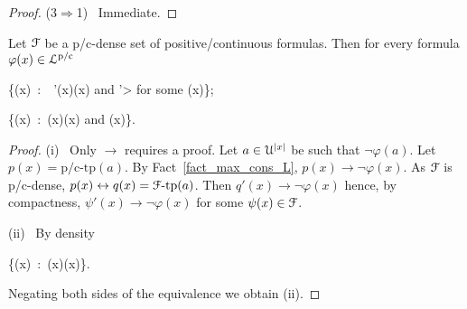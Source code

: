 \documentclass{amsproc}
\renewcommand*{\emph}[1]{%
   \smash{\tikz[baseline]\node[rectangle, fill=teal!25, rounded corners, inner xsep=0.5ex, inner ysep=0.2ex, anchor=base, minimum height = 2.7ex]{\strut #1};}}
\begin{document}
{\begin{proof}
  (3$\Rightarrow$1) \ 
  Immediate.
\end{proof}

\begin{proposition}\label{prop_Fapprox}
  Let ${\EuScript F}$ be a p/c-dense set of positive/continuous formulas.
  Then for every formula $\varphi(x)\in{\EuScript L}^{\rm p/c}$
  
  {\leftrightarrow}
  {\bigvee\big\{\phantom\neg\psi(x)\ :\ \ \psi'(x)\rightarrow\neg\varphi(x)\textrm{ and }\psi'>\psi\textrm{ for some }\psi(x)\big\};}

  {\leftrightarrow}
  {\bigvee\big\{\neg\psi(x)\ :\ \neg\psi(x)\rightarrow\neg\varphi(x)\textrm{ and }\psi(x)\big\}.}

\end{proposition}
 
\begin{proof} 
  (i) \ Only $\rightarrow$ requires a proof.
  Let $a\in {\EuScript U}^{|x|}$ be such that $\neg\varphi(a)$.
  Let $p(x)=\mbox{p/c-tp}(a)$.
  By Fact~\ref{fact_max_cons_L}, $p(x)\rightarrow\neg\varphi(x)$.
  As ${\EuScript F}$ is p/c-dense, $p(x)\leftrightarrow q(x)={\EuScript F}\mbox{-tp}(a)$.
  Then $q'(x)\rightarrow\neg\varphi(x)$ hence, by compactness, $\psi'(x)\rightarrow\neg\varphi(x)$ for some $\psi(x)\in{\EuScript F}$.

  (ii) \ By density

  {\leftrightarrow}
  {\bigwedge\big\{\psi(x)\ :\ \varphi(x)\rightarrow\psi(x)\big\}.}
  
  Negating both sides of the equivalence we obtain (ii).
\end{proof}


\begin{comment}
\section{Elimination of quantifiers of sort \textsf{I} for positive formulas}\label{Ielimination}

We write \emph{${\EuScript L}^{\rm p/c}_{{\sf I}{\rm qf}}$} for the set of positive/continuous formulas without quantifiers of sort ${\sf I}$.

In this section we show that ${\EuScript L}^{\rm p}_{{\sf I}{\rm qf}}$ is p-dense modulo $T$ (the theory of ${\EuScript U}$).
In plain words, this amounts to the elimination of the quantifiers of sort ${\sf I}$ up to some approximation.
In Section~\ref{cIelimination} we prove the analogous result for ${\EuScript L}^{\rm c}_{{\sf I}{\rm qf}}$.


\end{comment}}
\end{document}
